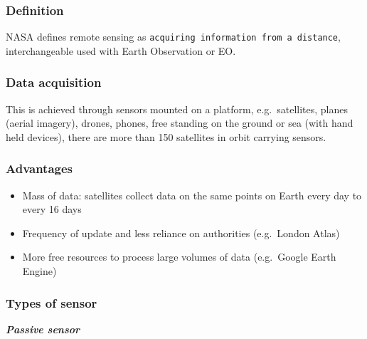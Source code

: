 \documentclass[
  letterpaper,
  DIV=11,
  numbers=noendperiod]{scrreprt}
\providecommand{\tightlist}{%
  \setlength{\itemsep}{0pt}\setlength{\parskip}{0pt}}\usepackage{longtable,booktabs,array}
\begin{document}
\hypertarget{definition}{%
\subsubsection*{\texorpdfstring{\textbf{Definition}}{Definition}}\label{definition}}

NASA defines remote sensing as
\texttt{acquiring\ information\ from\ a\ distance}, interchangeable used
with Earth Observation or EO.

\hypertarget{data-acquisition}{%
\subsubsection*{\texorpdfstring{\textbf{Data
acquisition}}{Data acquisition}}\label{data-acquisition}}

This is achieved through sensors mounted on a platform, e.g.~satellites,
planes (aerial imagery), drones, phones, free standing on the ground or
sea (with hand held devices), there are more than 150 satellites in
orbit carrying sensors.

\hypertarget{advantages}{%
\subsubsection*{\texorpdfstring{\textbf{Advantages}}{Advantages}}\label{advantages}}

\begin{itemize}
\tightlist
\item
  Mass of data: satellites collect data on the same points on Earth
  every day to every 16 days
\item
  Frequency of update and less reliance on authorities (e.g.~London
  Atlas)
\item
  More free resources to process large volumes of data (e.g.~Google
  Earth Engine)
\end{itemize}

\hypertarget{types-of-sensor}{%
\subsubsection*{\texorpdfstring{\textbf{Types of
sensor}}{Types of sensor}}\label{types-of-sensor}}

\textbf{\emph{Passive sensor}}
\end{document}
